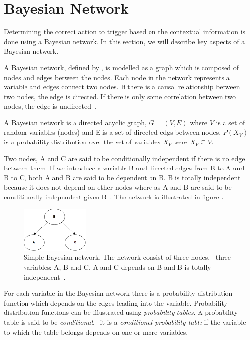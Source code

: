 \section{Bayesian Network}

Determining the correct action to trigger based on the contextual information is done using a Bayesian network. In this section, we will describe key aspects of a Bayesian network.

A Bayesian network, defined by , is modelled as a graph which is composed of nodes and edges between the nodes. Each node in the network represents a variable and edges connect two nodes. If there is a causal relationship between two nodes, the edge is directed. If there is only some correlation between two nodes, the edge is undirected~\cite{stephenson2000introduction}.

\begin{definition}
\label{def:bayesian-network}
A Bayesian network is a directed acyclic graph, $G = (V, E)$ where $V$ is a set of random variables (nodes) and E is a set of directed edgs between nodes. $P(X_V)$ is a probability distribution over the set of variables $X_V$ were $X_V \subseteq V$.
\end{definition}

Two nodes, A and C are said to be conditionally independent if there is no edge between them. If we introduce a variable B and directed edges from B to A and B to C, both A and B are said to be dependent on B. B is totally independent because it does not depend on other nodes where as A and B are said to be conditionally independent given B~\cite{stephenson2000introduction}. The network is illustrated in figure .

\begin{figure}[h!]
\centering
\includegraphics[width=0.3\textwidth]{images/a_b_c_bayesian_network}
\caption{Simple Bayesian network. The network consist of three nodes, \ie~three variables: A, B and C. A and C depends on B and B is totally independent~\cite{stephenson2000introduction}.}
\label{fig:analysis:bayesian-network:abc}
\end{figure}

For each variable in the Bayesian network there is a probability distribution function which depends on the edges leading into the variable. Probability distribution functions can be illustrated using \emph{probability tables}. A probability table is said to be \emph{conditional}, \ie~it is a \emph{conditional probability table} if the variable to which the table belongs depends on one or more variables.

